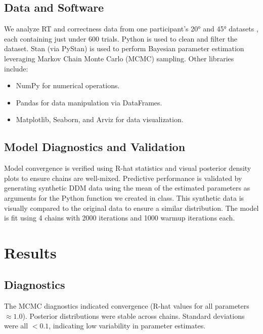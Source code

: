 \documentclass[12pt]{article}
\begin{document}
\subsection{Data and Software}
We analyze RT and correctness data from one participant's 20° and 45° datasets \cite{Krzeminski2021}, each containing just under 600 trials. Python is used to clean and filter the dataset. Stan (via PyStan) is used to perform Bayesian parameter estimation leveraging Markov Chain Monte Carlo (MCMC) sampling. Other libraries include:
\begin{itemize}
    \item NumPy for numerical operations.
    \item Pandas for data manipulation via DataFrames.
    \item Matplotlib, Seaborn, and Arviz for data visualization.
\end{itemize}

\subsection{Model Diagnostics and Validation}
Model convergence is verified using R-hat statistics and visual posterior density plots to ensure chains are well-mixed. Predictive performance is validated by generating synthetic DDM data using the mean of the estimated parameters as arguments for the Python function we created in class. This synthetic data is visually compared to the original data to ensure a similar distribution. The model is fit using 4 chains with 2000 iterations and 1000 warmup iterations each.

\section{Results}
\subsection{Diagnostics}
The MCMC diagnostics indicated convergence (R-hat values for all parameters $\approx 1.0$). Posterior distributions were stable across chains. Standard deviations were all $< 0.1$, indicating low variability in parameter estimates. 
\end{document}
